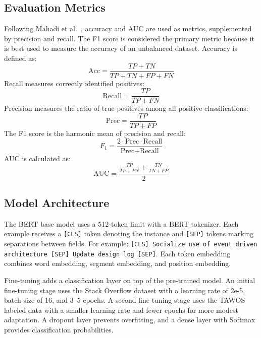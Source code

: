 \documentclass[preprint,12pt]{elsarticle}
\begin{document}
\subsection{Evaluation Metrics}

Following Mahadi et al.~\cite{mahadi2021}, accuracy and AUC are used as metrics, supplemented by precision and recall. The F1 score is considered the primary metric because it is best used to measure the accuracy of an unbalanced dataset. Accuracy is defined as:
\begin{equation}
\text{Acc} = \frac{TP + TN}{TP + TN + FP + FN}
\label{eq:acc}
\end{equation}
Recall measures correctly identified positives:
\begin{equation}
\text{Recall} = \frac{TP}{TP + FN}
\label{eq:recall}
\end{equation}
Precision measures the ratio of true positives among all positive classifications:
\begin{equation}
\text{Prec} = \frac{TP}{TP + FP}
\label{eq:prec}
\end{equation}
The F1 score is the harmonic mean of precision and recall:
\begin{equation}
F_1 = \frac{2 \cdot \text{Prec} \cdot \text{Recall}}{\text{Prec} + \text{Recall}}
\label{eq:f1}
\end{equation}
AUC is calculated as:
\begin{equation}
\text{AUC} = \frac{\frac{TP}{TP+FN} + \frac{TN}{TN+FP}}{2}
\label{eq:auc}
\end{equation}

\subsection{Model Architecture}

The BERT base model uses a 512-token limit with a BERT tokenizer. Each example receives a \texttt{[CLS]} token denoting the instance and \texttt{[SEP]} tokens marking separations between fields. For example: \texttt{[CLS] Socialize use of event driven architecture [SEP] Update design log [SEP]}. Each token embedding combines word embedding, segment embedding, and position embedding.

Fine-tuning adds a classification layer on top of the pre-trained model. An initial fine-tuning stage uses the Stack Overflow dataset with a learning rate of 2e-5, batch size of 16, and 3--5 epochs. A second fine-tuning stage uses the TAWOS labeled data with a smaller learning rate and fewer epochs for more modest adaptation. A dropout layer prevents overfitting, and a dense layer with Softmax provides classification probabilities.
\end{document}
